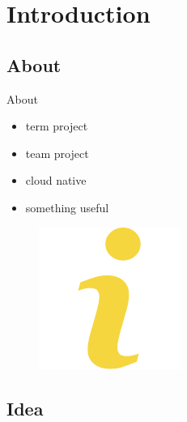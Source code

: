 \documentclass[]{beamer}
\begin{document}

\section[Introduction]{Introduction}

  \subsection{About}

    \begin{frame}{About}
      \setlength{\columnsep}{-125mm}
      \begin{adjustwidth}{20mm}{-25mm}
        \begin{multicols}{2}
          \begin{itemize}
            \item term project
            \item team project
            \item cloud native
            \item something useful
          \end{itemize}

          \columnbreak

          \begin{figure}[H]
            \includegraphics[width=.25\textwidth,height=.25\textheight,keepaspectratio]{img/info.pdf}
          \end{figure}
        \end{multicols}
      \end{adjustwidth}
    \end{frame}

  \subsection{Idea}
\end{document}
